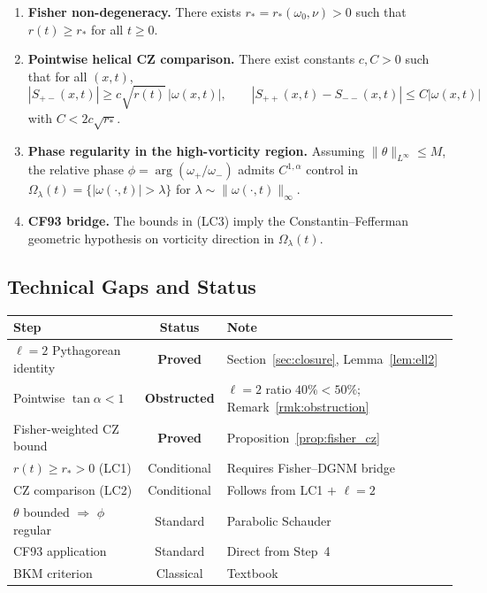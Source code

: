 \documentclass[12pt,a4paper]{article}
\theoremstyle{definition}
\begin{document}
\begin{enumerate}[label=\textbf{(LC\arabic*)}]
\item \textbf{Fisher non-degeneracy.}
There exists $r_*=r_*(\omega_0,\nu)>0$ such that $r(t)\ge r_*$ for all $t\ge 0$.

\item \textbf{Pointwise helical CZ comparison.}
There exist constants $c,C>0$ such that for all $(x,t)$,
\[
|S_{+-}(x,t)| \ge c\sqrt{r(t)}\,|\omega(x,t)|,\qquad
|S_{++}(x,t)-S_{--}(x,t)| \le C|\omega(x,t)|
\]
with $C<2c\sqrt{r_*}$.

\item \textbf{Phase regularity in the high-vorticity region.}
Assuming $\|\theta\|_{L^\infty}\le M$, the relative phase $\phi=\arg(\omega_+/\omega_-)$ admits $C^{1,\alpha}$ control
in $\Omega_\lambda(t)=\{|\omega(\cdot,t)|>\lambda\}$ for $\lambda\sim \|\omega(\cdot,t)\|_\infty$.

\item \textbf{CF93 bridge.}
The bounds in (LC3) imply the Constantin--Fefferman geometric hypothesis on vorticity direction in $\Omega_\lambda(t)$.
\end{enumerate}

\subsection{Technical Gaps and Status}

\begin{center}
\begin{tabular}{lcp{7cm}}
\toprule
\textbf{Step} & \textbf{Status} & \textbf{Note} \\
\midrule
$\ell=2$ Pythagorean identity & \textbf{Proved} & Section~\ref{sec:closure}, Lemma~\ref{lem:ell2} \\
Pointwise $\tan\alpha<1$ & \textbf{Obstructed} & $\ell=2$ ratio $40\%<50\%$; Remark~\ref{rmk:obstruction} \\
Fisher-weighted CZ bound & \textbf{Proved} & Proposition~\ref{prop:fisher_cz} \\
$r(t) \geq r_* > 0$ (LC1) & Conditional & Requires Fisher--DGNM bridge \\
CZ comparison (LC2) & Conditional & Follows from LC1 $+$ $\ell=2$ \\
$\theta$ bounded $\Rightarrow$ $\phi$ regular & Standard & Parabolic Schauder \\
CF93 application & Standard & Direct from Step~4 \\
BKM criterion & Classical & Textbook \\
\bottomrule
\end{tabular}
\end{center}
\end{document}
